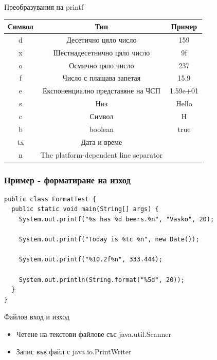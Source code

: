 \documentclass{beamer}
\begin{document}
\begin{frame}{Преобразувания на printf}
  \transdissolve
  \begin{tabular}{|c|c|c|}
    \hline
    Символ  & Тип                &          Пример \\
    \hline
    d & Десетично цяло число &                         159 \\
    \hline
    x & Шестнадесетнично цяло число &                 9f \\
    \hline
    o & Осмично цяло число  &                      237 \\
    \hline
    f & Число с плащава запетая &             15.9 \\
    \hline
    e & Експоненциално представяне на ЧСП &           1.59e+01 \\
    \hline
    s & Низ &                                                Hello \\
    \hline
    c & Символ &                                                 H \\
    \hline
    b &  boolean                 &                        true \\
    \hline
    tx & Дата и време &  \\
    \hline
    n & The platform-dependent line separator & \\
    \hline
  \end{tabular}

\end{frame}

\begin{frame}[fragile]
  \frametitle{Пример - форматиране на изход}
  \transdissolve
\begin{lstlisting}
public class FormatTest {
  public static void main(String[] args) {
    System.out.printf("%s has %d beers.%n", "Vasko", 20);

    System.out.printf("Today is %tc %n", new Date());

    System.out.printf("%10.2f%n", 333.444);

    System.out.println(String.format("%5d", 20));
  }
}  
\end{lstlisting}
\end{frame}

\begin{frame}{Файлов вход и изход}
  \transdissolve
  \begin{itemize}
  \item Четене на текстови файлове със java.util.Scanner \pause
  \item Запис във файл с java.io.PrintWriter \pause
  \end{itemize}
\end{frame}
\end{document}
